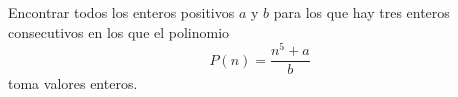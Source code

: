 Encontrar todos los enteros positivos $a$ y $b$ para los que hay tres enteros consecutivos en los que el polinomio \[ P(n) = \frac{n^5+a}{b} \] toma valores enteros.
